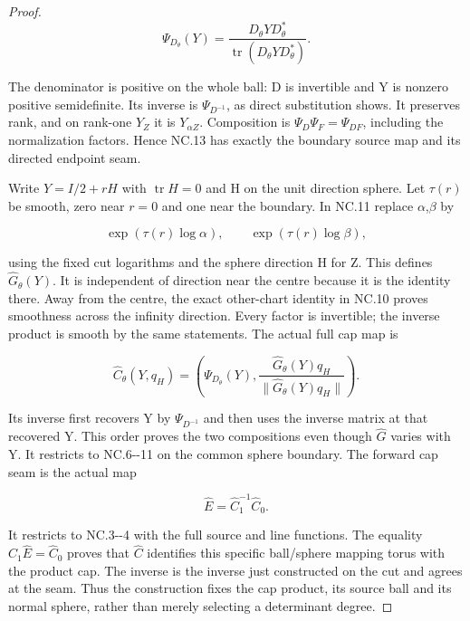 \begin{proof}
\[
 \Psi_{D_\theta}(Y)=
 \frac{D_\theta YD_\theta^*}
      {\operatorname{tr}(D_\theta YD_\theta^*)}.           \tag{NC.13}
\]

The denominator is positive on the whole ball: D is invertible and
Y is nonzero positive semidefinite. Its inverse is \(\Psi_{D^{-1}}\), as
direct substitution shows. It preserves rank, and on rank-one \(Y_Z\)
it is \(Y_{\alpha Z}\). Composition is \(\Psi_D \Psi_F=\Psi_{DF}\), including
the normalization factors. Hence NC.13 has exactly the boundary
source map and its directed endpoint seam.

Write \(Y=I/2+r H\) with \(\operatorname{tr} H=0\) and H on the unit direction sphere. Let
\(\tau(r)\) be smooth, zero near \(r=0\) and one near the boundary. In NC.11
replace \(\alpha\),\(\beta\) by

\[
 \exp(\tau(r)\log\alpha),\qquad
 \exp(\tau(r)\log\beta),                                \tag{NC.14}
\]

using the fixed cut logarithms and the sphere direction H for Z.
This defines \(\widehat G_\theta(Y)\). It is independent of direction near
the centre because it is the identity there. Away from the centre,
the exact other-chart identity in NC.10 proves smoothness across
the infinity direction. Every factor is invertible; the inverse
product is smooth by the same statements. The actual full cap map is

\[
 \widehat C_\theta(Y,q_H)=
 \left(\Psi_{D_\theta}(Y),
 \frac{\widehat G_\theta(Y)q_H}
      {\|\widehat G_\theta(Y)q_H\|}\right).              \tag{NC.15}
\]

Its inverse first recovers Y by \(\Psi_{D^{-1}}\) and then uses the inverse
matrix at that recovered Y. This order proves the two compositions
even though \(\widehat G\) varies with Y. It restricts to NC.6-\/-11 on the
common sphere boundary. The forward cap seam is the actual map

\[
                    \widehat E=\widehat C_1^{-1}\widehat C_0.
                                                        \tag{NC.16}
\]

It restricts to NC.3-\/-4 with the full source and line functions.
The equality \(\widehat C_{1} \widehat E=\widehat C_{0}\) proves that \(\widehat C\) identifies this
specific ball/sphere mapping torus with the product cap. The inverse
is the inverse just constructed on the cut and agrees at the seam.
Thus the construction fixes the cap product, its source ball and
its normal sphere, rather than merely selecting a determinant degree.


\end{proof}
